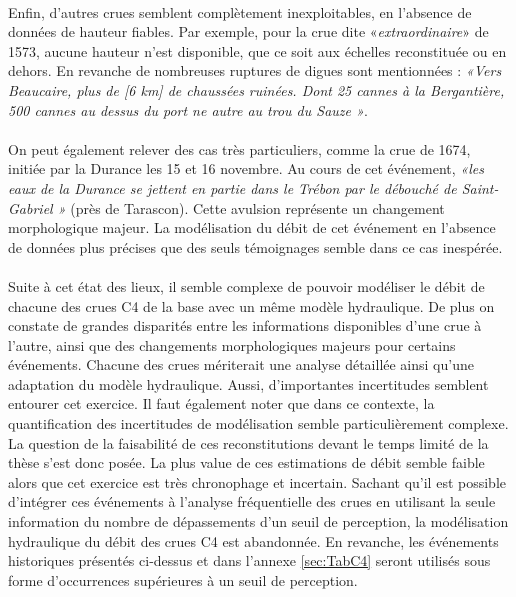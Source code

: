 \documentclass[11pt]{article}
\begin{document}
	\paragraph{} Enfin, d'autres crues semblent complètement inexploitables, en l'absence de données de hauteur fiables. Par exemple, pour la crue dite «\textit{extraordinaire}» de 1573, aucune hauteur n'est disponible, que ce soit aux échelles reconstituée ou en dehors. En revanche de nombreuses ruptures de digues sont mentionnées : \textit{«Vers Beaucaire, plus de [6 km] de chaussées ruinées. Dont 25 cannes à la Bergantière, 500 cannes au dessus du port ne autre au trou du Sauze »}. 
	
	\paragraph{} On peut également relever des cas très particuliers, comme la crue de 1674, initiée par la Durance les 15 et 16 novembre. Au cours de cet événement, \textit{«les eaux de la Durance se jettent en partie dans le Trébon par le débouché de Saint-Gabriel »} (près de Tarascon). Cette avulsion représente un changement morphologique majeur. La modélisation du débit de cet événement en l'absence de données plus précises que des seuls témoignages semble dans ce cas inespérée.	
	
	\paragraph{} Suite à cet état des lieux, il semble complexe de pouvoir modéliser le débit de chacune des crues C4 de la base avec un même modèle hydraulique. De plus on constate de grandes disparités entre les informations disponibles d'une crue à l'autre, ainsi que des changements morphologiques majeurs pour certains événements. Chacune des crues mériterait une analyse détaillée ainsi qu'une adaptation du modèle hydraulique. Aussi, d'importantes incertitudes semblent entourer cet exercice. Il faut également noter que dans ce contexte, la quantification des incertitudes de modélisation semble particulièrement complexe. La question de la faisabilité de ces reconstitutions devant le temps limité de la thèse s'est donc posée. La plus value de ces estimations de débit semble faible alors que cet exercice est très chronophage et incertain. Sachant qu'il est possible d'intégrer ces événements à l'analyse fréquentielle des crues en utilisant la seule information du nombre de dépassements d'un seuil de perception, la modélisation hydraulique du débit des crues C4 est abandonnée. En revanche, les événements historiques présentés ci-dessus et dans l'annexe \ref{sec:TabC4} seront utilisés sous forme d'occurrences supérieures à un seuil de perception. 
	
\end{document}
